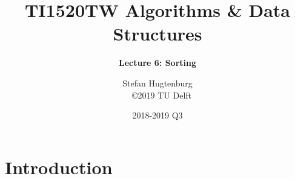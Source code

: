 

\title[Algorithms \& Data Structures]{TI1520TW Algorithms \& Data Structures}
\subtitle{\color{cyan} \textbf{Lecture 6: Sorting}}
\author{Stefan Hugtenburg\\ {\tiny{\qquad~~\copyright 2019 TU Delft}}}
\date{2018-2019 Q3}



\frame{\titlepage}

\section{Introduction}














\frame{\titlepage}


